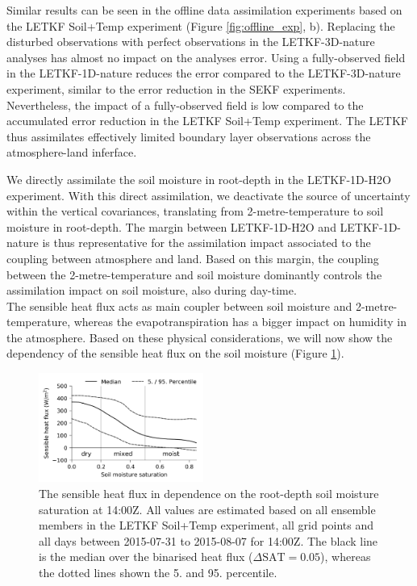 \documentclass[HESSD, manuscript]{copernicus}
\begin{document}
Similar results can be seen in the offline data assimilation experiments based on the LETKF Soil+Temp experiment (Figure \ref{fig:offline_exp}, b).
Replacing the disturbed observations with perfect observations in the LETKF-3D-nature analyses has almost no impact on the analyses error.
Using a fully-observed field in the LETKF-1D-nature reduces the error compared to the LETKF-3D-nature experiment, similar to the error reduction in the SEKF experiments.
Nevertheless, the impact of a fully-observed field is low compared to the accumulated error reduction in the LETKF Soil+Temp experiment.
The LETKF thus assimilates effectively limited boundary layer observations across the atmosphere-land inferface.

We directly assimilate the soil moisture in root-depth in the LETKF-1D-H2O experiment.
With this direct assimilation, we deactivate the source of uncertainty within the vertical covariances, translating from 2-metre-temperature to soil moisture in root-depth.
The margin between LETKF-1D-H2O and LETKF-1D-nature is thus representative for the assimilation impact associated to the coupling between atmosphere and land.
Based on this margin, the coupling between the 2-metre-temperature and soil moisture dominantly controls the assimilation impact on soil moisture, also during day-time.\\

The sensible heat flux acts as main coupler between soil moisture and 2-metre-temperature, whereas the evapotranspiration has a bigger impact on humidity in the atmosphere.
Based on these physical considerations, we will now show the dependency of the sensible heat flux on the soil moisture (Figure \ref{fig:sensible_smi}).

\begin{figure}[ht]
	\includegraphics[width=0.48\textwidth]{figures/fig_08_sensible_sat.png}
	\caption{
		The sensible heat flux in dependence on the root-depth soil moisture saturation at 14:00Z.
		All values are estimated based on all ensemble members in the LETKF Soil+Temp experiment, all grid points and all days between 2015-07-31 to 2015-08-07 for 14:00Z.
		The black line is the median over the binarised heat flux ($\Delta\text{SAT} = 0.05$), whereas the dotted lines shown the 5. and 95. percentile.
	}
	\label{fig:sensible_smi}
\end{figure}
\end{document}
